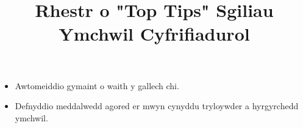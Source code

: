 \documentclass{article}
\title{Rhestr o "Top Tips" Sgiliau Ymchwil Cyfrifiadurol}
\date{}
\begin{document}
\maketitle

\begin{itemize}
  \item Awtomeiddio gymaint o waith y gallech chi.
  \item Defnyddio meddalwedd agored er mwyn cynyddu tryloywder a hyrgyrchedd ymchwil. 
\end{itemize}
\end{document}
